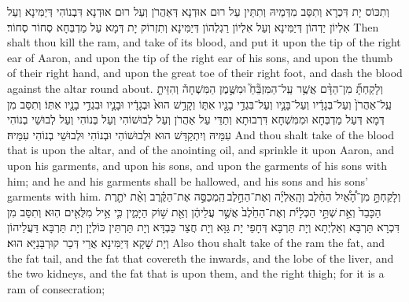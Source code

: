{וְתִכּוֹס יָת דִּכְרָא וְתִסַּב מִדְּמֵיהּ וְתִתֵּין עַל רוּם אוּדְנָא דְּאַהֲרֹן וְעַל רוּם אוּדְנָא דִּבְנוֹהִי דְּיַמִּינָא וְעַל אִלְיוֹן יַדְהוֹן דְּיַמִּינָא וְעַל אִלְיוֹן רַגְלְהוֹן דְּיַמִּינָא וְתִזְרוֹק יָת דְּמָא עַל מַדְבְּחָא סְחוֹר סְחוֹר׃}
{Then shalt thou kill the ram, and take of its blood, and put it upon the tip of the right ear of Aaron, and upon the tip of the right ear of his sons, and upon the thumb of their right hand, and upon the great toe of their right foot, and dash the blood against the altar round about.}{}
{וְלָקַחְתָּ֞ מִן־הַדָּ֨ם אֲשֶׁ֥ר עַֽל־הַמִּזְבֵּ֘חַ֮ וּמִשֶּׁ֣מֶן הַמִּשְׁחָה֒ וְהִזֵּיתָ֤ עַֽל־אַהֲרֹן֙ וְעַל־בְּגָדָ֔יו וְעַל־בָּנָ֛יו וְעַל־בִּגְדֵ֥י בָנָ֖יו אִתּ֑וֹ וְקָדַ֥שׁ הוּא֙ וּבְגָדָ֔יו וּבָנָ֛יו וּבִגְדֵ֥י בָנָ֖יו אִתּֽוֹ׃}
{וְתִסַּב מִן דְּמָא דְּעַל מַדְבְּחָא וּמִמִּשְׁחָא דִּרְבוּתָא וְתַדֵּי עַל אַהֲרֹן וְעַל לְבוּשׁוֹהִי וְעַל בְּנוֹהִי וְעַל לְבוּשֵׁי בְנוֹהִי עִמֵּיהּ וְיִתְקַדַּשׁ הוּא וּלְבוּשׁוֹהִי וּבְנוֹהִי וּלְבוּשֵׁי בְנוֹהִי עִמֵּיהּ׃}
{And thou shalt take of the blood that is upon the altar, and of the anointing oil, and sprinkle it upon Aaron, and upon his garments, and upon his sons, and upon the garments of his sons with him; and he and his garments shall be hallowed, and his sons and his sons’ garments with him.}{}
{וְלָקַחְתָּ֣ מִן־הָ֠אַ֠יִל הַחֵ֨לֶב וְהָֽאַלְיָ֜ה וְאֶת־הַחֵ֣לֶב \legarmeh  הַֽמְכַסֶּ֣ה אֶת־הַקֶּ֗רֶב וְאֵ֨ת יֹתֶ֤רֶת הַכָּבֵד֙ וְאֵ֣ת \legarmeh  שְׁתֵּ֣י הַכְּלָיֹ֗ת וְאֶת־הַחֵ֙לֶב֙ אֲשֶׁ֣ר עֲלֵיהֶ֔ן וְאֵ֖ת שׁ֣וֹק הַיָּמִ֑ין כִּ֛י אֵ֥יל מִלֻּאִ֖ים הֽוּא׃
}
{וְתִסַּב מִן דִּכְרָא תַּרְבָּא וְאַלְיְתָא וְיָת תַּרְבָּא דְּחָפֵי יָת גַּוָּא וְיָת חֲצַר כַּבְדָּא וְיָת תַּרְתֵּין כּוֹלְיָן וְיָת תַּרְבָּא דַּעֲלֵיהוֹן וְיָת שָׁקָא דְּיַמִּינָא אֲרֵי דְּכַר קוּרְבָּנַיָּא הוּא׃}
{Also thou shalt take of the ram the fat, and the fat tail, and the fat that covereth the inwards, and the lobe of the liver, and the two kidneys, and the fat that is upon them, and the right thigh; for it is a ram of consecration;}{}
